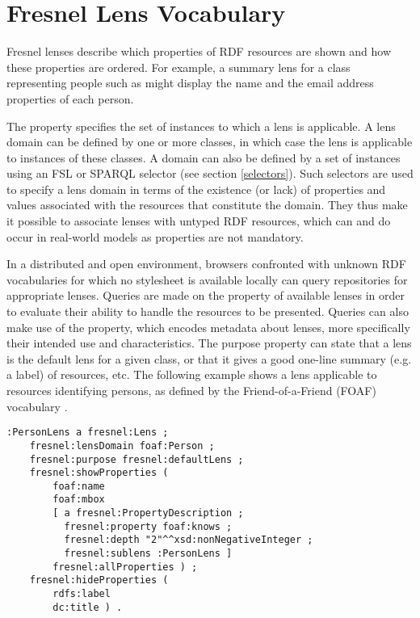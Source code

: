 \section{Fresnel Lens Vocabulary}

Fresnel lenses describe which properties of RDF resources are shown and how these properties are ordered. For example, a summary lens for a class representing people such as  might display the name and the email address properties of each person. 

The  property specifies the set of instances to which a lens is applicable. A lens domain can be defined by one or more classes, in which case the lens is applicable to instances of these classes. A domain can also be defined by a set of instances using an FSL or SPARQL selector (see section \ref{selectors}). Such selectors are used to specify a lens domain in terms of the existence (or lack) of properties and values associated with the resources that constitute the domain. They thus make it possible to associate lenses with untyped RDF resources, which can and do occur in real-world models as  properties are not mandatory. 

In a distributed and open environment, browsers confronted with unknown RDF vocabularies for which no stylesheet is available locally can query repositories for appropriate lenses. Queries are made on the  property of available lenses in order to evaluate their ability to handle the resources to be presented. Queries can also make use of the  property, which encodes metadata about lenses, more specifically their intended use and characteristics. The purpose property can state that a lens is the default lens for a given class, or that it gives a good one-line summary (e.g. a label) of resources, etc. The following example shows a lens applicable to resources identifying persons, as defined by the Friend-of-a-Friend (FOAF) vocabulary \cite{foaf}.
\begin{small}
\begin{verbatim}
:PersonLens a fresnel:Lens ;
    fresnel:lensDomain foaf:Person ;
    fresnel:purpose fresnel:defaultLens ;
    fresnel:showProperties ( 
        foaf:name
        foaf:mbox
        [ a fresnel:PropertyDescription ;
          fresnel:property foaf:knows ;
          fresnel:depth "2"^^xsd:nonNegativeInteger ;
          fresnel:sublens :PersonLens ]
        fresnel:allProperties ) ;
    fresnel:hideProperties ( 
        rdfs:label 
        dc:title ) .
\end{verbatim}
\end{small}


